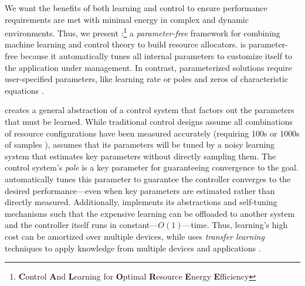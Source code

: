 We want the benefits of both learning and control to ensure
performance requirements are met with minimal energy in complex and
dynamic environments.  Thus, we present
\SYSTEM{}:\footnote{\textbf{C}ontrol \textbf{A}nd \textbf{L}earning
  for \textbf{O}ptimal \textbf{R}esource \textbf{E}nergy
  \textbf{E}fficiency} a \emph{parameter-free} framework for combining
machine learning and control theory to build resource allocators.
\SYSTEM{} is parameter-free because it automatically tunes all
internal parameters to customize itself to the application under
management.  In contrast, parameterized solutions require
user-specified parameters, like learning rate \cite{dubach2010,more}
or poles and zeros of characteristic equations
\cite{ControlWare,more}.

\SYSTEM{} creates a general abstraction of a control system that
factors out the parameters that must be learned.  While traditional
control designs assume all combinations of resource configurations
have been measured accurately (requiring 100s or 1000s of samples
\cite{}), \SYSTEM{} assumes that its parameters will be tuned by a
noisy learning system that estimates key parameters without directly
sampling them.  The control system's \emph{pole} is a key parameter
for guaranteeing convergence to the goal.  \SYSTEM{} automatically
tunes this parameter to guarantee the controller converges to the
desired performance---even when key parameters are estimated rather
than directly measured.  Additionally, \SYSTEM{} implements its
abstractions and self-tuning mechanisms such that the expensive
learning can be offloaded to another system and the controller itself
runs in constant---$O(1)$---time.  Thus, learning's high cost can be
amortized over multiple devices, while \SYSTEM{} uses \emph{transfer
  learning} techniques to apply knowledge from multiple devices and
applications \cite{transferlearning}.



